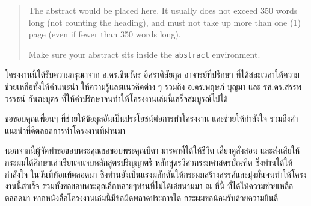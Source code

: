 \begin{abstract}
The abstract would be placed here. It usually does not exceed 350 words
long (not counting the heading), and must not take up more than one (1) page
(even if fewer than 350 words long).

Make sure your abstract sits inside the \texttt{abstract} environment.
\end{abstract}

\iffalse
\begin{dedication}
This document is dedicated to all Chiang Mai University students.

Dedication page is optional.
\end{dedication}
\fi %

\begin{acknowledgments}
โครงงานนี้ได้รับความกรุณาจาก อ.ดร.ชินวัตร อิศราดิสัยกุล อาจารย์ที่ปรึกษา ที่ได้สละเวลาให้ความช่วยเหลือทั้งให้คำแนะนำ ให้ความรู้และแนวคิดต่าง ๆ รวมถึง อ.ดร.พฤษภ์ บุญมา และ รศ.ดร.สรรพวรรธน์ กันตะบุตร ที่ให้คำปรึกษาจนทำให้โครงงานเล่มนี้เสร็จสมบูรณ์ไปได้
    
ขอขอบคุณเพื่อนๆ ที่ช่วยให้ข้อมูลอันเป็นประโยชน์ต่อการทำโครงงาน และช่วยให้กำลังใจ รวมถึงคำแนะนำที่ดีตลอดการทำโครงงานที่ผ่านมา

นอกจากนี้ผู้จัดทำขอขอบพระคุณขอขอบพระคุณบิดา มารดาที่ได้ให้ชีวิต เลี้ยงดูสั่งสอน และส่งเสียให้กระผมได้ศึกษาเล่าเรียนจนจบหลักสูตรปริญญาตรี 
หลักสูตรวิศวกรรมศาสตรบัณฑิต ซึ่งท่านได้ให้กำลังใจ ในวันที่ท้อแท้ตลอดมา ซึ่งท่านยังเป็นแรงผลักดันให้กระผมสร้างสรรค์และมุ่งมั่นจนทำให้โครงงานนี้สำเร็จ 
รวมทั้งขอขอบพระคุณอีกหลายๆท่านที่ไม่ได้เอ่ยนามมา ณ ที่นี้ ที่ได้ให้ความช่วยเหลือตลอดมา 
หากหนังสือโครงงานเล่มนี้มีข้อผิดพลาดประการใด กระผมขอน้อมรับด้วยความยินดี

\end{acknowledgments}%
\fi %

\contentspage

\ifproject
\figurelistpage

\tablelistpage
\fi %



